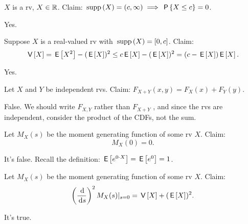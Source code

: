 \documentclass[tf-tutorial-all.tex]{subfiles}
\begin{document}


\begin{truefalse}
$X$ is a rv, $X  \in \mathbb{R}$. Claim: $\,\mathrm{supp}\left(X\right) = (c, \infty) \implies \,\mathsf{P}\left\{X\leq c\right\} = 0$.
\begin{solution}
Yes.
\end{solution}
\end{truefalse}

\begin{truefalse}
Suppose $X$ is a real-valued rv with $\,\mathrm{supp}\left(X\right) = [0, c]$. Claim:
\begin{equation}
\,\mathsf{V}\left[X\right] = \,\mathsf{E}\left[X^2\right] - (\,\mathsf{E}\left[X\right])^2 \leq c \,\mathsf{E}\left[X\right] - (\,\mathsf{E}\left[X\right])^2 = (c-\,\mathsf{E}\left[X\right])\,\mathsf{E}\left[X\right].
\end{equation}
\begin{solution}
Yes.
\end{solution}
\end{truefalse}


\begin{truefalse}
Let $X$ and $Y$ be independent rvs. Claim: $F_{X+Y}(x, y) = F_X(x) + F_{Y}(y)$.
\begin{solution}
False. We should write $F_{X,Y}$ rather than $F_{X+Y}$ , and since the rvs are independent, consider the product of the CDFs, not the sum.
\end{solution}
\end{truefalse}

\begin{truefalse}
Let $M_{X}(s)$ be the moment generating function of some rv $X$.  Claim:
\begin{equation}
M_{X}(0) = 0.
\end{equation}
\begin{solution}
It's false. Recall the definition: $\,\mathsf{E}\left[e^{0\cdot X}\right] = \,\mathsf{E}\left[e^0\right] = 1$.
\end{solution}
\end{truefalse}


\begin{truefalse}
Let $M_{X}(s)$ be the moment generating function of some rv $X$.  Claim:
\begin{equation}
\left(\frac{\d}{\d s}\right)^{2 }M_{X}(s)|_{s=0} =  \V X + (\E{X})^{2}.
\end{equation}
\begin{solution}
It's true.
\end{solution}
\end{truefalse}
\end{document}
